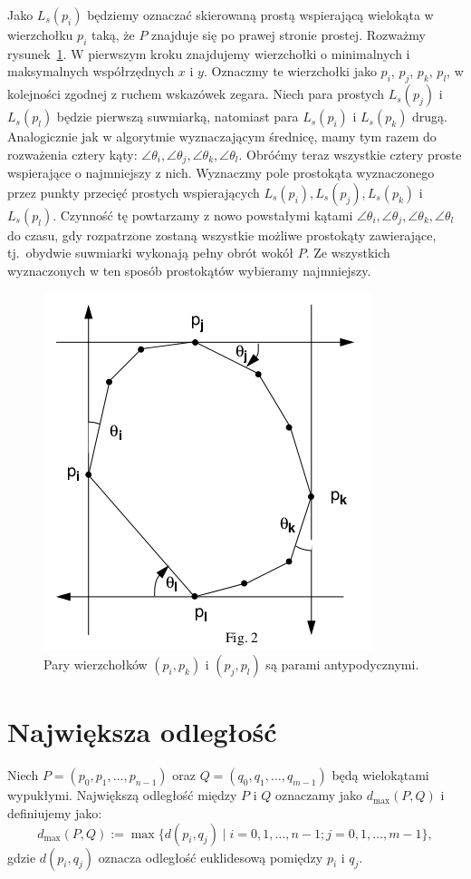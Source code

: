 Jako $L_s(p_i)$ będziemy oznaczać skierowaną prostą wspierającą
wielokąta w wierzchołku $p_i$ taką, że $P$ znajduje się po prawej
stronie prostej. Rozważmy rysunek~\ref{img:calipers2}. W pierwszym
kroku znajdujemy wierzchołki o minimalnych i maksymalnych
współrzędnych $x$ i $y$. Oznaczmy te wierzchołki jako $p_i$, $p_j$,
$p_k$, $p_l$, w kolejności zgodnej z ruchem wskazówek zegara. Niech
para prostych $L_s(p_j)$ i $L_s(p_l)$ będzie pierwszą suwmiarką,
natomiast para $L_s(p_i)$ i $L_s(p_k)$ drugą. Analogicznie jak w
algorytmie wyznaczającym średnicę, mamy tym razem do rozważenia cztery
kąty: $\angle{\theta_i}, \angle{\theta_j}, \angle{\theta_k},
\angle{\theta_l}$. Obróćmy teraz wszystkie cztery proste wspierające o
najmniejszy z nich. Wyznaczmy pole prostokąta wyznaczonego przez
punkty przecięć prostych wspierających $L_s(p_i), L_s(p_j), L_s(p_k)$
i $L_s(p_l)$. Czynność tę powtarzamy z nowo powstałymi kątami
$\angle{\theta_i}, \angle{\theta_j}, \angle{\theta_k},
\angle{\theta_l}$ do czasu, gdy rozpatrzone zostaną wszystkie możliwe
prostokąty zawierające, tj.\ obydwie suwmiarki wykonają pełny obrót
wokół $P$. Ze wszystkich wyznaczonych w ten sposób prostokątów
wybieramy najmniejszy.

\begin{figure}[tb]
  \centering
  \includegraphics[scale=0.5]{img/calipers2}
  \caption{\label{img:calipers2} Pary wierzchołków $(p_i, p_k)$ i
    $(p_j, p_l)$ są parami antypodycznymi.}
\end{figure}

\section{Największa odległość\label{sec:max_dist}}
\begin{problem}
  Niech $P = (p_0, p_1, \ldots, p_{n-1})$ oraz $Q = (q_0, q_1, \ldots,
  q_{m-1})$ będą wielokątami wypukłymi. Największą odległość między
  $P$ i $Q$ oznaczamy jako $d_{\max}(P, Q)$ i definiujemy
  jako: $$d_{\max}(P, Q) := \max{\{ d(p_i, q_j) \mid i = 0, 1, \ldots,
    n - 1; j = 0, 1, \ldots, m - 1\}},$$ gdzie $d(p_i, q_j)$ oznacza
  odległość euklidesową pomiędzy $p_i$ i $q_j$.
\end{problem}


